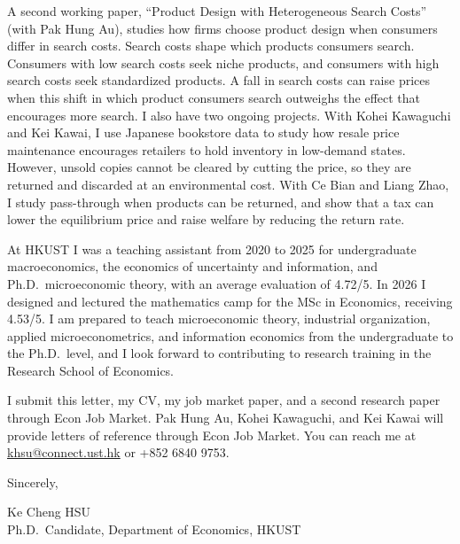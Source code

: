 \documentclass[11pt]{article}
\begin{document}
A second working paper, ``Product Design with Heterogeneous Search Costs'' (with Pak Hung Au), studies how firms choose product design when consumers differ in search costs. Search costs shape which products consumers search. Consumers with low search costs seek niche products, and consumers with high search costs seek standardized products. A fall in search costs can raise prices when this shift in which product consumers search outweighs the effect that encourages more search. I also have two ongoing projects. With Kohei Kawaguchi and Kei Kawai, I use Japanese bookstore data to study how resale price maintenance encourages retailers to hold inventory in low-demand states. However, unsold copies cannot be cleared by cutting the price, so they are returned and discarded at an environmental cost. With Ce Bian and Liang Zhao, I study pass-through when products can be returned, and show that a tax can lower the equilibrium price and raise welfare by reducing the return rate.

At HKUST I was a teaching assistant from 2020 to 2025 for undergraduate macroeconomics, the economics of uncertainty and information, and Ph.D.\ microeconomic theory, with an average evaluation of 4.72/5. In 2026 I designed and lectured the mathematics camp for the MSc in Economics, receiving 4.53/5. I am prepared to teach microeconomic theory, industrial organization, applied microeconometrics, and information economics from the undergraduate to the Ph.D.\ level, and I look forward to contributing to research training in the Research School of Economics.

I submit this letter, my CV, my job market paper, and a second research paper through Econ Job Market. Pak Hung Au, Kohei Kawaguchi, and Kei Kawai will provide letters of reference through Econ Job Market. You can reach me at \href{mailto:khsu@connect.ust.hk}{khsu@connect.ust.hk} or +852 6840 9753.

\vspace{0.25em}
Sincerely,

\vspace{0.25em}
Ke Cheng HSU \\
Ph.D.\ Candidate, Department of Economics, HKUST
\end{document}
